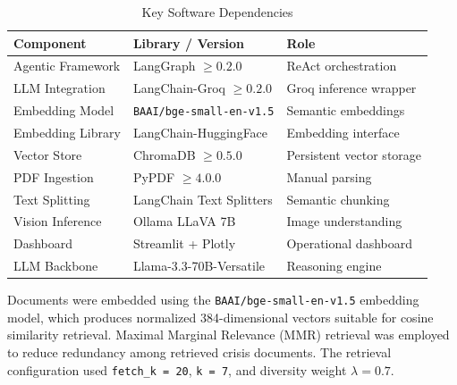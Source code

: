 \documentclass[conference]{IEEEtran}
\begin{document}
\begin{table}[h]
\centering
\caption{Key Software Dependencies}
\label{tab:software_stack}

\footnotesize

\begin{tabular}{|p{1.8cm}|p{2.4cm}|p{2.0cm}|}
\hline
Component & Library / Version & Role \\ \hline

Agentic Framework &
LangGraph \(\geq 0.2.0\) &
ReAct orchestration \\ \hline

LLM Integration &
LangChain-Groq \(\geq 0.2.0\) &
Groq inference wrapper \\ \hline

Embedding Model &
\texttt{BAAI/bge-small-en-v1.5} &
Semantic embeddings \\ \hline

Embedding Library &
LangChain-HuggingFace &
Embedding interface \\ \hline

Vector Store &
ChromaDB \(\geq 0.5.0\) &
Persistent vector storage \\ \hline

PDF Ingestion &
PyPDF \(\geq 4.0.0\) &
Manual parsing \\ \hline

Text Splitting &
LangChain Text Splitters &
Semantic chunking \\ \hline

Vision Inference &
Ollama LLaVA 7B &
Image understanding \\ \hline

Dashboard &
Streamlit + Plotly &
Operational dashboard \\ \hline

LLM Backbone &
Llama-3.3-70B-Versatile &
Reasoning engine \\ \hline

\end{tabular}

\end{table}

Documents were embedded using the
\texttt{BAAI/bge-small-en-v1.5} embedding model, which produces normalized
384-dimensional vectors suitable for cosine similarity retrieval. Maximal Marginal
Relevance (MMR) retrieval was employed to reduce redundancy among retrieved crisis
documents. The retrieval configuration used \texttt{fetch\_k = 20},
\texttt{k = 7}, and diversity weight \(\lambda = 0.7\).
\end{document}
